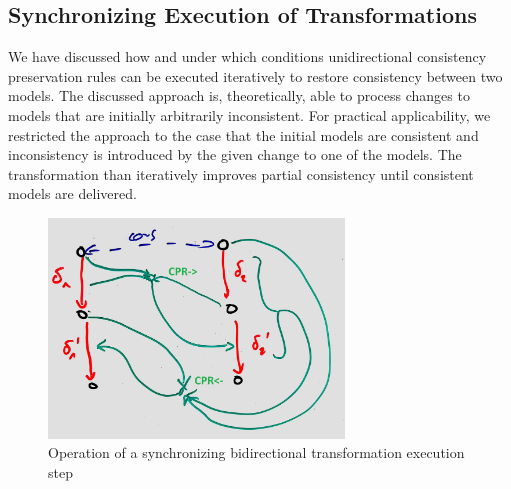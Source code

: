 


\subsection{Synchronizing Execution of Transformations}

We have discussed how and under which conditions unidirectional consistency preservation rules can be executed iteratively to restore consistency between two models.
The discussed approach is, theoretically, able to process changes to models that are initially arbitrarily inconsistent.
For practical applicability, we restricted the approach to the case that the initial models are consistent and inconsistency is introduced by the given change to one of the models.
The transformation than iteratively improves partial consistency until consistent models are delivered.

\begin{figure}
    \centering
    \includegraphics[width=0.7\textwidth]{figures/correctness/synchronization/synchronizing_execution_step.jpg}    
    \caption[Operation of a synchronizing bidirectional transformation execution step]{Operation of a synchronizing bidirectional transformation execution step}
    \label{fig:synchronization:synchronizing_execution_step}
\end{figure}

